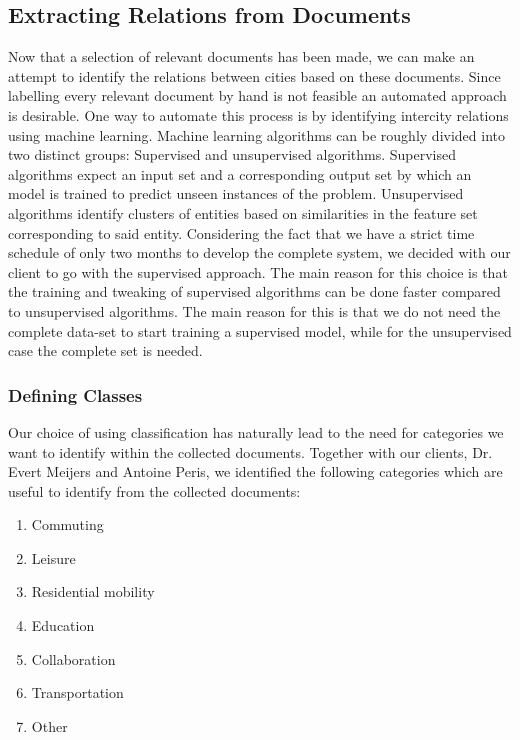 \subsection{Extracting Relations from Documents}
Now that a selection of relevant documents has been made, we can make an attempt to identify the relations between cities based on these documents. Since labelling every relevant document by hand is not feasible an automated approach is desirable. 
One way to automate this process is by identifying intercity relations using machine learning. Machine learning algorithms can be roughly divided into two distinct groups: Supervised and unsupervised algorithms. Supervised algorithms expect an input set and a corresponding output set by which an model is trained to predict unseen instances of the problem. Unsupervised algorithms identify clusters of entities based on similarities in the feature set corresponding to said entity.
Considering the fact that we have a strict time schedule of only two months to develop the complete system, we decided with our client to go with the supervised approach. 
The main reason for this choice is that the training and tweaking of supervised algorithms can be done faster compared to unsupervised algorithms. The main reason for this is that we do not need the complete data-set to start training a supervised model, while for the unsupervised case the complete set is needed.

\subsubsection{Defining Classes}
Our choice of using classification has naturally lead to the need for categories we want to identify within the collected documents. Together with our clients, Dr. Evert Meijers and Antoine Peris, we identified the following categories which are useful to identify from the collected documents:\\

\begin{enumerate}
    \item Commuting
    \item Leisure
    \item Residential mobility
    \item Education
    \item Collaboration
    \item Transportation
    \item Other
\end{enumerate}

